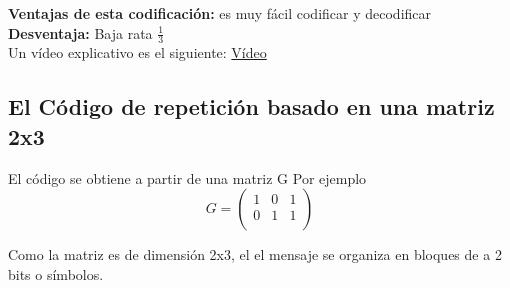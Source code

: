 	\begin{table}[h!]
	\captionsetup{justification = raggedright,singlelinecheck = false}
	\caption{Alguna descripción.}
	\label{tabla:tabla13}
	\centering
\end{table}

\textbf{Ventajas de esta codificación:} es muy fácil codificar y decodificar\\

\textbf{Desventaja:} Baja rata $ \frac{1}{3} $\\
Un vídeo explicativo es el siguiente:
\textcolor{blue}{\href{https://www.youtube.com/watch?v=0CLTy231Hsw}{Vídeo }}

\subsection{ El Código de repetición basado en una matriz 2x3}

El código se obtiene a partir de una matriz G
Por ejemplo 
\begin{equation} \label{capsiete_ocho}
G= \left(
\begin{array}{lcr}
1 & 0 & 1 \\
0 & 1 & 1 \\
\end{array}
\right)
\end{equation}

Como la matriz es de dimensión 2x3, el el mensaje se organiza en bloques de a 2 bits o símbolos.

